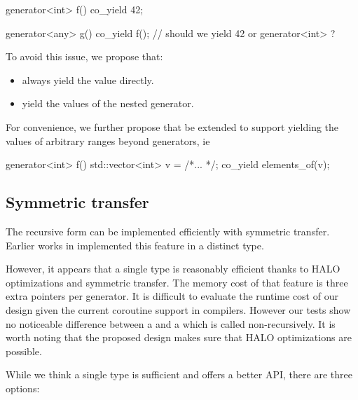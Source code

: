\documentclass{wg21}
\begin{document}
\begin{colorblock}
    generator<int> f()
    {
        co_yield 42;
    }

    generator<any> g()
    {
        co_yield f(); // should we yield 42 or generator<int> ?
    }

\end{colorblock}

To avoid this issue, we propose that:

\begin{itemize}
    \item {} always yield the value directly.
    \item {} yield the values of the nested generator.
\end{itemize}


For convenience, we further propose that  be extended to support
yielding the values of arbitrary ranges beyond generators, ie

\begin{colorblock}
    generator<int> f()
    {
        std::vector<int> v = /*... */;
        co_yield elements_of(v);
    }

\end{colorblock}

\subsection{Symmetric transfer}

The recursive form can be implemented efficiently with symmetric transfer.
Earlier works in \cite{CppCoro} implemented this feature in a distinct  type.

However, it appears that a single type is reasonably efficient thanks to HALO optimizations and symmetric transfer.
The memory cost of that feature is three extra pointers per generator.
It is difficult to evaluate the runtime cost of our design given the current coroutine support in compilers.
However our tests show no noticeable difference between a  and a 
which is called non-recursively. It is worth noting that the proposed design makes sure that HALO \cite{P0981R0} optimizations are possible.

While we think a single  type is sufficient and offers a better API, there are three options:
\end{document}
